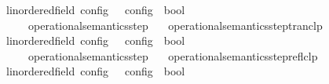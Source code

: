 \begin{isabellebody}
\ \ {\isacharcolon}{\isacharcolon}{\isacartoucheopen}{\isacharparenleft}{\isacharprime}{\isasymtau}{\isacharcolon}{\isacharcolon}linordered{\isacharunderscore}field{\isacharparenright}\ config\ {\isasymRightarrow}\ {\isacharprime}{\isasymtau}\ config\ {\isasymRightarrow}\ bool{\isacartoucheclose}\ \ \ \ \ \ \ \ \ \ \ \ \ \ \ \ {\isacharparenleft}{\isachardoublequoteopen}{\isacharunderscore}\ {\isasymhookrightarrow}\isactrlsup {\isacharasterisk}\isactrlsup {\isacharasterisk}\ {\isacharunderscore}{\isachardoublequoteclose}\ {}{}{\isacharparenright}\isanewline
{}\isanewline
\ \ {\isacartoucheopen}{\isasymC}\ {\isasymhookrightarrow}\isactrlsup {\isacharasterisk}\isactrlsup {\isacharasterisk}\ {\isasymC}\ {\isasymequiv}\ operational{\isacharunderscore}semantics{\isacharunderscore}step\isactrlsup {\isacharasterisk}\isactrlsup {\isacharasterisk}\ {\isasymC}\ {\isasymC}\isanewline
\isanewline
{}\isamarkupfalse%
\ operational{\isacharunderscore}semantics{\isacharunderscore}step{\isacharunderscore}tranclp\isanewline
\ \ {\isacharcolon}{\isacharcolon}{\isacartoucheopen}{\isacharparenleft}{\isacharprime}{\isasymtau}{\isacharcolon}{\isacharcolon}linordered{\isacharunderscore}field{\isacharparenright}\ config\ {\isasymRightarrow}\ {\isacharprime}{\isasymtau}\ config\ {\isasymRightarrow}\ bool{\isacartoucheclose}\ \ \ \ \ \ \ \ \ \ \ \ \ \ \ \ {\isacharparenleft}{\isachardoublequoteopen}{\isacharunderscore}\ {\isasymhookrightarrow}\isactrlsup {\isacharplus}\isactrlsup {\isacharplus}\ {\isacharunderscore}{\isachardoublequoteclose}\ {}{}{\isacharparenright}\isanewline
{}\isanewline
\ \ {\isacartoucheopen}{\isasymC}\ {\isasymhookrightarrow}\isactrlsup {\isacharplus}\isactrlsup {\isacharplus}\ {\isasymC}\ {\isasymequiv}\ operational{\isacharunderscore}semantics{\isacharunderscore}step\isactrlsup {\isacharplus}\isactrlsup {\isacharplus}\ {\isasymC}\ {\isasymC}\isanewline
\isanewline
{}\isamarkupfalse%
\ operational{\isacharunderscore}semantics{\isacharunderscore}step{\isacharunderscore}reflclp\isanewline
\ \ {\isacharcolon}{\isacharcolon}{\isacartoucheopen}{\isacharparenleft}{\isacharprime}{\isasymtau}{\isacharcolon}{\isacharcolon}linordered{\isacharunderscore}field{\isacharparenright}\ config\ {\isasymRightarrow}\ {\isacharprime}{\isasymtau}\ config\ {\isasymRightarrow}\ bool{\isacartoucheclose}\ \ \ \ \ \ \ \ \ \ \ \ \ \ \ \ {\isacharparenleft}{\isachardoublequoteopen}{\isacharunderscore}\ {\isasymhookrightarrow}\isactrlsup {\isacharequal}\isactrlsup {\isacharequal}\ {\isacharunderscore}{\isachardoublequoteclose}\ {}{}{\isacharparenright}\isanewline

\end{isabellebody}
